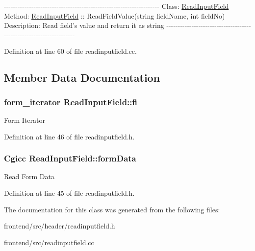 -\/-\/-\/-\/-\/-\/-\/-\/-\/-\/-\/-\/-\/-\/-\/-\/-\/-\/-\/-\/-\/-\/-\/-\/-\/-\/-\/-\/-\/-\/-\/-\/-\/-\/-\/-\/-\/-\/-\/-\/-\/-\/-\/-\/-\/-\/-\/-\/-\/-\/-\/-\/-\/-\/-\/-\/-\/-\/-\/-\/-\/-\/-\/-\/-\/-\/-\/-\/ \-Class\-: \hyperlink{classReadInputField}{\-Read\-Input\-Field} \-Method\-: \hyperlink{classReadInputField}{\-Read\-Input\-Field} \-:\-: \-Read\-Field\-Value(string field\-Name, int field\-No) \-Description\-: \-Read field's value and return it as string -\/-\/-\/-\/-\/-\/-\/-\/-\/-\/-\/-\/-\/-\/-\/-\/-\/-\/-\/-\/-\/-\/-\/-\/-\/-\/-\/-\/-\/-\/-\/-\/-\/-\/-\/-\/-\/-\/-\/-\/-\/-\/-\/-\/-\/-\/-\/-\/-\/-\/-\/-\/-\/-\/-\/-\/-\/-\/-\/-\/-\/-\/-\/-\/-\/-\/-\/-\/ 

\-Definition at line 60 of file readinputfield.\-cc.



\subsection{\-Member \-Data \-Documentation}
\hypertarget{classReadInputField_ae252dc321be04c2c1afa6928ad16a45d}{
\subsubsection[{fi}]{\setlength{\rightskip}{0pt plus 5cm}form\-\_\-iterator {\bf \-Read\-Input\-Field\-::fi}}}\label{d8/d37/classReadInputField_ae252dc321be04c2c1afa6928ad16a45d}
\-Form \-Iterator 

\-Definition at line 46 of file readinputfield.\-h.

\hypertarget{classReadInputField_a1e4ebac8979fd9b2771320d669fce5fc}{
\subsubsection[{form\-Data}]{\setlength{\rightskip}{0pt plus 5cm}\-Cgicc {\bf \-Read\-Input\-Field\-::form\-Data}}}\label{d8/d37/classReadInputField_a1e4ebac8979fd9b2771320d669fce5fc}
\-Read \-Form \-Data 

\-Definition at line 45 of file readinputfield.\-h.



\-The documentation for this class was generated from the following files\-:\begin{DoxyCompactItemize}
\item 
frontend/src/header/readinputfield.\-h\item 
frontend/src/readinputfield.\-cc\end{DoxyCompactItemize}
